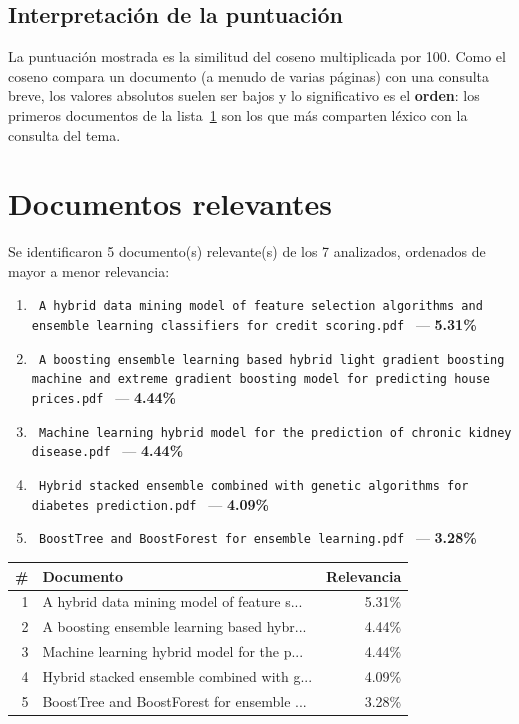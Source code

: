 \documentclass[11pt,a4paper]{article}
\newcommand{\nombrearchivo}[1]{\texttt{#1}}
\newcommand{\pcento}{\%}
\begin{document}
\subsection{Interpretación de la puntuación}

La puntuación mostrada es la similitud del coseno multiplicada por 100. Como
el coseno compara un documento (a menudo de varias páginas) con una consulta
breve, los valores absolutos suelen ser bajos y lo significativo es el
\textbf{orden}: los primeros documentos de la lista~\ref{sec:relevantes} son
los que más comparten léxico con la consulta del tema.

\section{Documentos relevantes}
\label{sec:relevantes}

Se identificaron 5 documento(s) relevante(s) de los
7 analizados, ordenados de mayor a menor relevancia:

\begin{enumerate}
\setlength{\itemsep}{6pt}
\renewcommand{\labelenumi}{\arabic{enumi}.}
  \item \nombrearchivo{ A hybrid data mining model of feature selection algorithms and ensemble learning classifiers for credit scoring.pdf } --- \textbf{ 5.31\pcento}
  \item \nombrearchivo{ A boosting ensemble learning based hybrid light gradient boosting machine and extreme gradient boosting model for predicting house prices.pdf } --- \textbf{ 4.44\pcento}
  \item \nombrearchivo{ Machine learning hybrid model for the prediction of chronic kidney disease.pdf } --- \textbf{ 4.44\pcento}
  \item \nombrearchivo{ Hybrid stacked ensemble combined with genetic algorithms for diabetes prediction.pdf } --- \textbf{ 4.09\pcento}
  \item \nombrearchivo{ BoostTree and BoostForest for ensemble learning.pdf } --- \textbf{ 3.28\pcento}
\end{enumerate}

\begin{center}
\begin{tabular}{r p{8.5cm} r}
\hline
\textbf{\#} & \textbf{Documento} & \textbf{Relevancia} \\
\hline
1 & A hybrid data mining model of feature s... & 5.31\pcento \\
2 & A boosting ensemble learning based hybr... & 4.44\pcento \\
3 & Machine learning hybrid model for the p... & 4.44\pcento \\
4 & Hybrid stacked ensemble combined with g... & 4.09\pcento \\
5 & BoostTree and BoostForest for ensemble ... & 3.28\pcento \\
\hline
\end{tabular}
\end{center}
\end{document}
